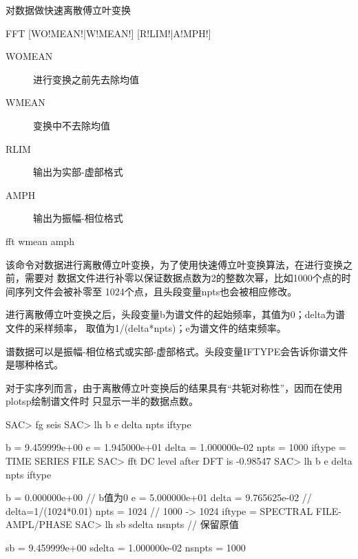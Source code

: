 \label{cmd:fft}

对数据做快速离散傅立叶变换

\begin{SACSTX}
FFT [WO!MEAN!|W!MEAN!] [R!LIM!|A!MPH!]
\end{SACSTX}

\begin{description}
\item [WOMEAN] 进行变换之前先去除均值
\item [WMEAN] 变换中不去除均值
\item [RLIM] 输出为实部-虚部格式
\item [AMPH] 输出为振幅-相位格式
\end{description}

\begin{SACDFT}
fft wmean amph
\end{SACDFT}

该命令对数据进行离散傅立叶变换，为了使用快速傅立叶变换算法，在进行变换之前，需要对
数据文件进行补零以保证数据点数为2的整数次幂，比如1000个点的时间序列文件会被补零至
1024个点，且头段变量npts也会被相应修改。

进行离散傅立叶变换之后，头段变量b为谱文件的起始频率，其值为0；delta为谱文件的采样频率，
取值为1/(delta*npts)；e为谱文件的结束频率。

谱数据可以是振幅-相位格式或实部-虚部格式。头段变量IFTYPE会告诉你谱文件是哪种格式。

对于实序列而言，由于离散傅立叶变换后的结果具有“共轭对称性”，因而在使用plotsp绘制谱文件时
只显示一半的数据点数。

\begin{SACCode}
SAC> fg seis
SAC> lh b e delta npts iftype

          b = 9.459999e+00
          e = 1.945000e+01
      delta = 1.000000e-02
       npts = 1000
     iftype = TIME SERIES FILE
SAC> fft
 DC level after DFT is -0.98547
SAC> lh b e delta npts iftype

          b = 0.000000e+00              // b值为0
          e = 5.000000e+01
      delta = 9.765625e-02              // delta=1/(1024*0.01)
       npts = 1024                      // 1000 -> 1024
     iftype = SPECTRAL FILE-AMPL/PHASE
SAC> lh sb sdelta nsnpts                // 保留原值

         sb = 9.459999e+00
     sdelta = 1.000000e-02
     nsnpts = 1000
\end{SACCode}

